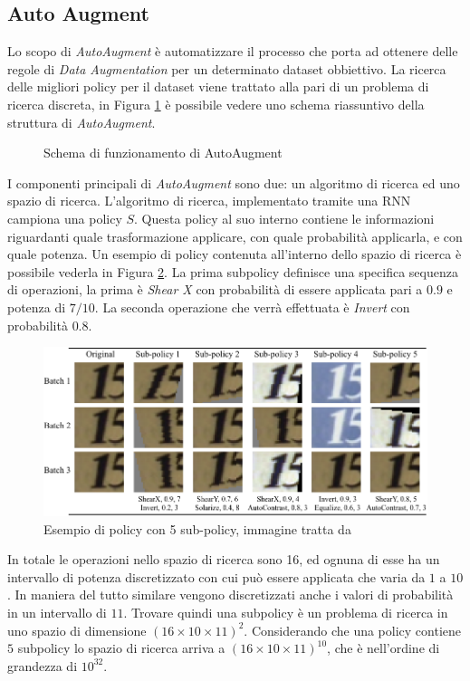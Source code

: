 \subsection{Auto Augment}
\label{subsec:auto_augment}
Lo scopo di \textit{AutoAugment} \cite{DBLP:journals/corr/abs-1805-09501} è automatizzare il processo che porta ad ottenere delle regole di \textit{Data Augmentation} per un determinato dataset obbiettivo. La ricerca delle migliori policy per il dataset viene trattato alla pari di un problema di ricerca discreta, in Figura \ref{fig:AutoAugment} è possibile vedere uno schema riassuntivo della struttura di \textit{AutoAugment}.
\begin{figure}
    \centering
    \caption{Schema di funzionamento di AutoAugment}
    \label{fig:AutoAugment}
\end{figure}
I componenti principali di \textit{AutoAugment} sono due: un algoritmo di ricerca ed uno spazio di ricerca. 
L'algoritmo di ricerca, implementato tramite una \ac{RNN} campiona una policy $S$. Questa policy al suo interno contiene le informazioni riguardanti quale trasformazione applicare, con quale probabilità applicarla, e con quale potenza. Un esempio di policy contenuta all'interno dello spazio di ricerca è possibile vederla in Figura \ref{fig:policy}. La prima subpolicy definisce una specifica sequenza di operazioni, la prima è \textit{Shear X} con probabilità di essere applicata pari a $0.9$ e potenza di $7/10$. La seconda operazione che verrà effettuata è \textit{Invert} con probabilità $0.8$. 
\begin{figure}[]
    \centering
    \includegraphics[width=\textwidth]{images/svhn_viz_policy2.png}
    \caption{Esempio di policy con 5 sub-policy, immagine tratta da \cite{DBLP:journals/corr/abs-1805-09501}}
    \label{fig:policy}
\end{figure} 
In totale le operazioni nello spazio di ricerca sono 16, ed ognuna di esse ha un intervallo di potenza discretizzato con cui può essere applicata che varia da $1$ a $10$. In maniera del tutto similare vengono discretizzati anche i valori di probabilità in un intervallo di $11$. Trovare quindi una subpolicy è un problema di ricerca in uno spazio di dimensione $(16 \times 10 \times 11)^2$. Considerando che una policy contiene $5$ subpolicy lo spazio di ricerca arriva a $(16 \times 10 \times 11)^{10}$, che è nell'ordine di grandezza di $10^{32}$.

